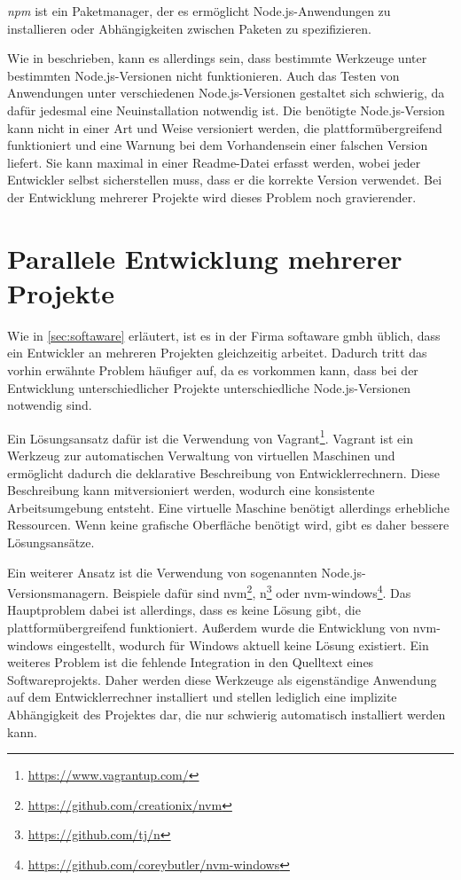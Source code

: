 \emph{npm} ist ein Paketmanager, der es ermöglicht Node.js-Anwendungen zu installieren oder Abhängigkeiten zwischen Paketen zu spezifizieren.

Wie in \autocite{Papa.n:online} beschrieben, kann es allerdings sein, dass bestimmte Werkzeuge unter bestimmten Node.js-Versionen nicht funktionieren.
Auch das Testen von Anwendungen unter verschiedenen Node.js-Versionen gestaltet sich schwierig, da dafür jedesmal eine Neuinstallation notwendig ist.
Die benötigte Node.js-Version kann nicht in einer Art und Weise versioniert werden, die plattformübergreifend funktioniert und eine Warnung bei dem Vorhandensein einer falschen Version liefert.
Sie kann maximal in einer Readme-Datei erfasst werden, wobei jeder Entwickler selbst sicherstellen muss, dass er die korrekte Version verwendet.
Bei der Entwicklung mehrerer Projekte wird dieses Problem noch gravierender.


\section{Parallele Entwicklung mehrerer Projekte}
Wie in \cref{sec:softaware} erläutert, ist es in der Firma softaware gmbh üblich, dass ein Entwickler an mehreren Projekten gleichzeitig arbeitet.
Dadurch tritt das vorhin erwähnte Problem häufiger auf, da es vorkommen kann, dass bei der Entwicklung unterschiedlicher Projekte unterschiedliche Node.js-Versionen notwendig sind.

Ein Lösungsansatz dafür ist die Verwendung von Vagrant\footnote{\url{https://www.vagrantup.com/}}. 
Vagrant ist ein Werkzeug zur automatischen Verwaltung von virtuellen Maschinen und ermöglicht dadurch die deklarative Beschreibung von Entwicklerrechnern.
Diese Beschreibung kann mitversioniert werden, wodurch eine konsistente Arbeitsumgebung entsteht.
Eine virtuelle Maschine benötigt allerdings erhebliche Ressourcen.
Wenn keine grafische Oberfläche benötigt wird, gibt es daher bessere Lösungsansätze.

Ein weiterer Ansatz ist die Verwendung von sogenannten Node.js-Versionsmanagern.
Beispiele dafür sind nvm\footnote{\url{https://github.com/creationix/nvm}}, n\footnote{\url{https://github.com/tj/n}} oder nvm-windows\footnote{\url{https://github.com/coreybutler/nvm-windows}}.
Das Hauptproblem dabei ist allerdings, dass es keine Lösung gibt, die plattformübergreifend funktioniert.
Außerdem wurde die Entwicklung von nvm-windows eingestellt, wodurch für Windows aktuell keine Lösung existiert.
Ein weiteres Problem ist die fehlende Integration in den Quelltext eines Softwareprojekts.
Daher werden diese Werkzeuge als eigenständige Anwendung auf dem Entwicklerrechner installiert und stellen lediglich eine implizite Abhängigkeit des Projektes dar, die nur schwierig automatisch installiert werden kann.

